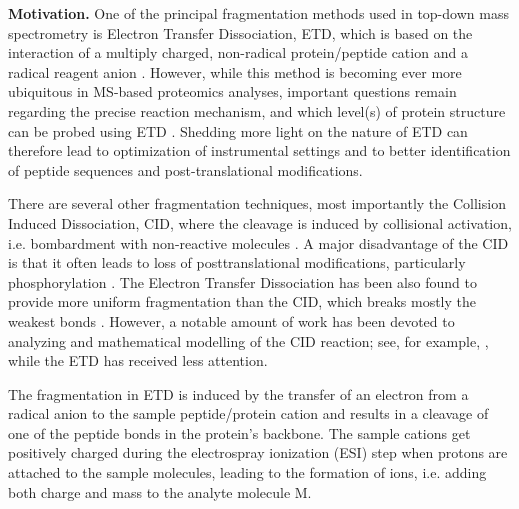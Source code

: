 \documentclass{llncs}
\begin{document}

\textbf{Motivation.} One of the principal fragmentation methods used in top-down mass spectrometry is Electron Transfer Dissociation, ETD, which is based on the interaction of a multiply charged, non-radical protein/peptide cation and a radical reagent anion \cite{Syka2004-rg,Zhurov2013-ua}. However, while this method is becoming ever more ubiquitous in MS-based proteomics analyses, important questions remain regarding the precise reaction mechanism, and which level(s) of protein structure can be probed using ETD \cite{Sohn2009-zv,Sohn2015-rp}. Shedding more light on the nature of ETD can therefore lead to optimization of instrumental settings and to better identification of peptide sequences and post-translational modifications.

There are several other fragmentation techniques, most importantly the Collision Induced Dissociation, CID, where the cleavage is induced by collisional activation, i.e. bombardment with non-reactive molecules \cite{Mitchell_Wells2005-gn}. A major disadvantage of the CID is that it often leads to loss of posttranslational modifications, particularly phosphorylation \cite{Kim2012-yz}. The Electron Transfer Dissociation has been also found to provide more uniform fragmentation than the CID, which breaks mostly the weakest bonds \cite{Kim2012-yz,Zhurov2013-ua}. However, a notable amount of work has been devoted to analyzing and mathematical modelling of the CID reaction; see, for example, \cite{Zhang2004-fp,Zhang2005-jn,Wysocki2000-am}, while the ETD has received less attention.

The fragmentation in ETD is induced by the transfer of an electron from a radical anion to the sample peptide/protein cation and results in a cleavage of one of the peptide bonds  in the protein’s backbone. The sample cations get positively charged during the electrospray ionization (ESI) step \cite{Fenn1989-mp} when protons are attached to the sample molecules, leading to the formation of  ions, i.e. adding both charge and mass to the analyte molecule M.
\end{document}
